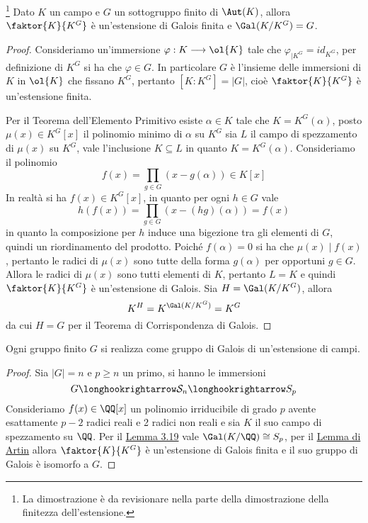 \documentclass[11pt]{scrartcl}
\begin{document}
\begin{lemma}
    \footnote{
        La dimostrazione è da revisionare nella parte della dimostrazione 
        della finitezza dell'estensione.
    }
    \label{lemma3.20}
    Dato $K$ un campo e $G$ un sottogruppo finito di $\Aut(K)$, allora 
    $\faktor{K}{K^G}$ è un'estensione di Galois finita e $\Gal(K/K^G) = G$.
\end{lemma}

\begin{proof}
    Consideriamo un'immersione $\varphi: K \longrightarrow \ol{K}$ tale che
    $\varphi_{\mid K^G} = id_{K^G}$, per definizione di $K^G$ si ha che 
    $\varphi \in G$. In particolare $G$ è l'insieme delle immersioni di $K$
    in $\ol{K}$ che fissano $K^G$, pertanto $[K:K^G] = |G|$, cioè $\faktor{K}{K^G}$
    è un'estensione finita. 

    Per il Teorema dell'Elemento Primitivo esiste $\alpha \in K$ tale che 
    $K = K^G(\alpha)$, posto $\mu(x) \in K^G[x]$ il polinomio minimo di $\alpha$
    su $K^G$ sia $L$ il campo di spezzamento di $\mu(x)$ su $K^G$, vale
    l'inclusione $K \subseteq L$ in quanto $K = K^G(\alpha)$. Consideriamo 
    il polinomio 
    \[
        f(x) = \prod_{g \in G}(x - g(\alpha)) \in K[x]
    \]
    In realtà si ha $f(x) \in K^G[x]$, in quanto per ogni $h \in G$ vale 
    \[
        h(f(x)) = \prod_{g \in G}(x - (hg)(\alpha)) = f(x)
    \]
    in quanto la composizione per $h$ induce una bigezione tra gli elementi di $G$,
    quindi un riordinamento del prodotto. Poiché $f(\alpha) = 0$ si ha che
    $\mu(x)\mid f(x)$, pertanto le radici di $\mu(x)$ sono tutte della forma
    $g(\alpha)$ per opportuni $g \in G$. Allora le radici di $\mu(x)$ sono
    tutti elementi di $K$, pertanto $L = K$ e quindi $\faktor{K}{K^G}$ è 
    un'estensione di Galois. Sia $H = \Gal(K/K^G)$, allora
    \[
        K^H = K^{\Gal(K/K^G)} = K^G
    \]
    da cui $H = G$ per il Teorema di Corrispondenza di Galois.
\end{proof}

\begin{proposition}
    Ogni gruppo finito $G$ si realizza come gruppo di Galois di un'estensione
    di campi.
\end{proposition}

\begin{proof}
    Sia $|G| = n$ e $p \geq n$ un primo, si hanno le immersioni
    \[
        G \longhookrightarrow \mathcal{S}_n \longhookrightarrow S_p
    \]
    Consideriamo $f(x) \in \QQ[x]$ un polinomio irriducibile di grado $p$
    avente esattamente $p - 2$ radici reali e 2 radici non reali e sia $K$ 
    il suo campo di spezzamento su $\QQ$. Per il \hyperref[lemma3.19]{Lemma 3.19}
    vale $\Gal(K/\QQ) \cong S_p$, per il \hyperref[lemma3.20]{Lemma di Artin}
    allora $\faktor{K}{K^G}$ è un'estensione di Galois finita e il suo gruppo
    di Galois è isomorfo a $G$.
\end{proof}
\end{document}
